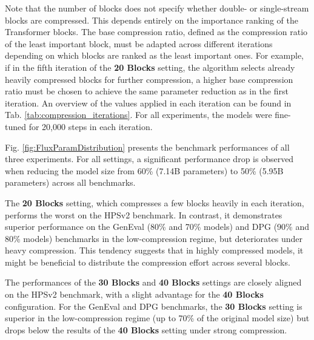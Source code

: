 Note that the number of blocks does not specify whether double- or single-stream blocks are compressed. This depends entirely on the importance ranking of the Transformer blocks. The base compression ratio, defined as the compression ratio of the least important block, must be adapted across different iterations depending on which blocks are ranked as the least important ones. For example, if in the fifth iteration of the  \textbf{20 Blocks} setting, the algorithm selects already heavily compressed blocks for further compression, a higher base compression ratio must be chosen to achieve the same parameter reduction as in the first iteration. An overview of the values applied in each iteration can be found in Tab. \ref{tab:compression_iterations}. For all experiments, the models were fine-tuned for 20,000 steps in each iteration.

Fig. \ref{fig:FluxParamDistribution} presents the benchmark performances of all three experiments.  For all settings, a significant performance drop is observed when reducing the model size from 60\% (7.14B parameters) to 50\% (5.95B parameters) across all benchmarks.

The \textbf{20 Blocks} setting, which compresses a few blocks heavily in each iteration, performs the worst on the HPSv2 benchmark. In contrast, it demonstrates superior performance on the GenEval (80\% and 70\% models) and DPG (90\% and 80\% models) benchmarks in the low-compression regime, but deteriorates under heavy compression. This  tendency suggests that in highly compressed models, it might be beneficial to distribute the compression effort across several blocks.

The performances of the \textbf{30 Blocks} and \textbf{40 Blocks} settings are closely aligned on the HPSv2 benchmark, with a slight advantage for the \textbf{40 Blocks} configuration. For the GenEval and DPG benchmarks, the \textbf{30 Blocks} setting is superior in the low-compression regime (up to 70\% of the original model size) but drops below the results of the \textbf{40 Blocks} setting under strong compression. 

